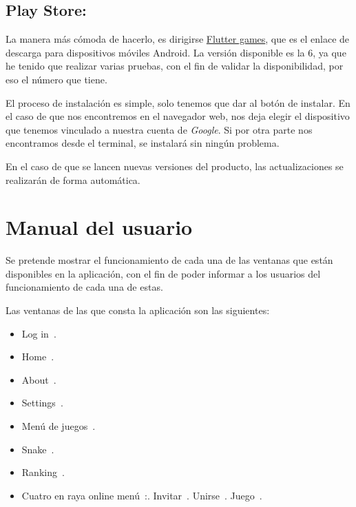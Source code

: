 \subsection{Play Store:}
La manera más cómoda de hacerlo, es dirigirse \href{https://play.google.com/store/apps/details?id=com.ubu.flutter_snake}{Flutter games}, que es el enlace de descarga para dispositivos móviles Android. La versión disponible es la 6, ya que he tenido que realizar varias pruebas, con el fin de validar la disponibilidad, por eso el número que tiene.




El proceso de instalación es simple, solo tenemos que dar al botón de instalar. En el caso de que nos encontremos en el navegador web, nos deja elegir el dispositivo que tenemos vinculado a nuestra cuenta de \emph{Google}. Si por otra parte nos encontramos desde el terminal, se instalará sin ningún problema.

En el caso de que se lancen nuevas versiones del producto, las actualizaciones se realizarán de forma automática.

\section{Manual del usuario}
Se pretende mostrar el funcionamiento de cada una de las ventanas que están disponibles en la aplicación, con el fin de poder informar a los usuarios del funcionamiento de cada una de estas.

Las ventanas de las que consta la aplicación son las siguientes:

\begin{itemize}
	\tightlist
	\item Log in~\pageref{login}.
	\item Home~\pageref{home}.
	\item About~\pageref{about}.
	\item Settings~\pageref{settings}.
	\item Menú de juegos~\pageref{menugames}.
	\item Snake~\pageref{snake}.
	\item Ranking~\pageref{rank}.
	\item Cuatro en raya online menú~\pageref{cuatromenu}:.
	\subitem Invitar~\pageref{cuatroinvitar}.
	\subitem Unirse~\pageref{cuatrounir}.
	\subitem Juego~\pageref{cuatrojuego}.
\end{itemize}

